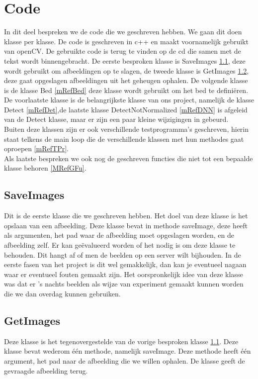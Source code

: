 \section{Code}
\label{mrefCod}
In dit deel bespreken we de code die we geschreven hebben. We gaan dit doen klasse per klasse. De code is geschreven in c++ en maakt voornamelijk gebruikt van openCV. De gebruikte code is terug te vinden op de cd die samen met de tekst wordt binnengebracht. De eerste besproken klasse is SaveImages \ref{mRefSIm}, deze wordt gebruikt om afbeeldingen op te slagen, de tweede klasse is GetImages \ref{mRefGIm}, deze gaat opgeslagen afbeeldingen uit het geheugen ophalen. De volgende klasse is de klasse Bed \ref{mRefBed} deze klasse wordt gebruikt om het bed te defini\"eren. De voorlaatste klasse is de belangrijkste klasse van ons project, namelijk de klasse Detect \ref{mRefDet},de laatste klasse DetectNotNormalized \ref{mRefDNN} is afgeleid van de Detect klasse, maar er zijn een paar kleine wijzigingen in gebeurd.\\ 
Buiten deze klassen zijn er ook verschillende testprogramma's geschreven, hierin staat telkens de main loop die de verschillende klassen met hun methodes gaat oproepen \ref{mRefTPr}.\\
Als laatste bespreken we ook nog de geschreven functies die niet tot een bepaalde klasse behoren \ref{MRefGFu}.

\subsection{SaveImages}
\label{mRefSIm}
Dit is de eerste klasse die we geschreven hebben. Het doel van deze klasse is het opslaan van een afbeelding. Deze klasse bevat in methode saveImage, deze heeft als argumenten, het pad waar de afbeelding moet opgeslagen worden, en de afbeelding zelf.  
Er kan ge\"evalueerd worden of het nodig is om deze klasse te behouden. Dit hangt af of men de beelden op een server wilt bijhouden. In de eerste fasen van het project is dit wel gemakkelijk, dan kan je eventueel nagaan waar er eventueel fouten gemaakt zijn. 
Het oorspronkelijk idee van deze klasse was dat er 's nachts beelden als wijze van experiment gemaakt kunnen worden die we dan overdag kunnen gebruiken.

\subsection{GetImages}
\label{mRefGIm}
Deze klasse is het tegenovergestelde van de vorige besproken klasse \ref{mRefSIm}. Deze klasse bevat wederom \'e\'en methode, namelijk saveImage. Deze methode heeft \'e\'en argument, het pad naar de afbeelding die we willen ophalen. De klasse geeft de gevraagde afbeelding terug.

